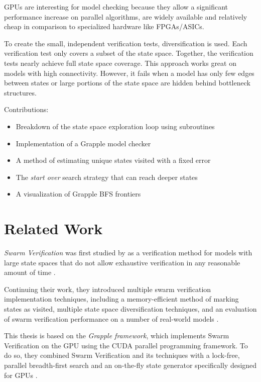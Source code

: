 \documentclass[
fancyheadings, %
%
%
]{stsreprt}
\begin{document}
GPUs are interesting for model checking because they allow a significant performance increase on parallel algorithms, are widely available and relatively cheap in comparison to specialized hardware like FPGAs/ASICs.


To create the small, independent verification tests, diversification is used.
Each verification test only covers a subset of the state space.
Together, the verification tests nearly achieve full state space coverage.
This approach works great on models with high connectivity.
However, it fails when a model has only few edges between states or large portions of the state space are hidden behind bottleneck structures.

Contributions:

\begin{itemize}
    \item Breakdown of the state space exploration loop using subroutines
    \item Implementation of a Grapple model checker
    \item A method of estimating unique states visited with a fixed error
    \item The \emph{start over} search strategy that can reach deeper states
    \item A visualization of Grapple BFS frontiers
\end{itemize}

\chapter{Related Work}

\emph{Swarm Verification} was first studied by \citeauthor*{Holzmann2008.Swarm-Verification} as a verification method for models with large state spaces that do not allow exhaustive verification in any reasonable amount of time \cite{Holzmann2008.Swarm-Verification}.

Continuing their work, they introduced multiple swarm verification implementation techniques, including a memory-efficient method of marking states as visited, multiple state space diversification techniques, and an evaluation of swarm verification performance on a number of real-world models \cite{Holzmann2011.Swarm-Verification-Techniques}.

This thesis is based on the \emph{Grapple framework}, which implements Swarm Verification on the GPU using the CUDA parallel programming framework.
To do so, they combined Swarm Verification and its techniques with a lock-free, parallel breadth-first search and an on-the-fly state generator specifically designed for GPUs \cite{DeFrancisco2020.Grapple}.
\end{document}
